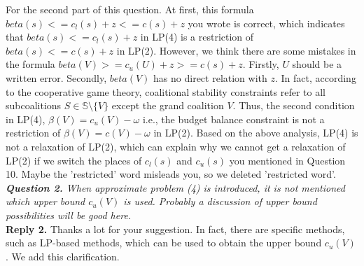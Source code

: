 \documentclass[11pt]{article}
\begin{document}
For the second part of this question.
At first, this formula $beta(s) <= c_l(s) + z <= c(s) + z$ you wrote is correct, which indicates that $beta(s) <= c_l(s) + z$ in LP(4) is a restriction of $beta(s) <= c(s) + z$ in LP(2).
However, we think there are some mistakes in the formula $beta(V) >= c_u(U) + z >= c(s) + z$. Firstly, $U$ should be a written error. Secondly, $beta(V)$ has no direct relation with $z$.
In fact, according to the cooperative game theory, coalitional stability constraints refer to all subcoalitions $S \in \mathbb{S} \setminus \big\{V\big\}$ except the grand coalition $V$.
Thus, the second condition in LP(4),
$\beta(V)=c_u(V)-\omega$ i.e., the budget balance constraint is not a restriction of $\beta(V)=c(V)-\omega$ in LP(2).
Based on the above analysis, LP(4) is not a relaxation of LP(2), which can explain why we cannot get a relaxation of LP(2) if we switch the places of $c_l(s)$ and $c_u(s)$ you mentioned in Question 10.
Maybe the 'restricted' word misleads you, so we deleted 'restricted word'.
\\[4mm]
%
%
%
\noindent \textit{\textbf{Question 2.}
When approximate problem (4) is introduced, it is not mentioned which upper bound $c_u(V)$ is used. Probably a discussion of upper bound possibilities will be good here.}
\\[2mm]
\noindent \textbf{Reply 2.}
Thanks a lot for your suggestion.
In fact, there are specific methods, such as LP-based methods, which can be used to obtain the upper bound $c_u(V)$. We add this clarification.
\end{document}
